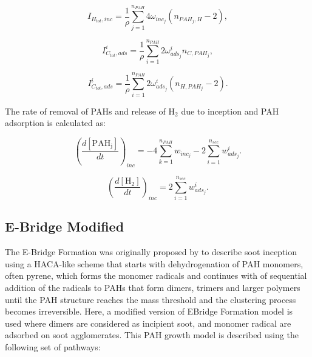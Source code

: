 \begin{equation}
	I_{H_{tot},{inc}} = \frac{1}{\rho}
	\sum_{j=1}^{n_{PAH}}
	4\omega_{inc_{j}} 
	\left(
	n_{PAH_j,H}-2
	\right)
	\label{eqn:IHtot_inc_dimcoal},
\end{equation}

\begin{equation}
	I^i_{C_{tot},ads} =
	\frac{1}{\rho}
	\sum_{i=1}^{n_{PAH}}
	2\omega^i_{ads_j}
	n_{C,PAH_j}
	\label{eqn:ICtotads_dimcoal},
\end{equation}

\begin{equation}
	I^i_{C_{tot},ads} =
	\frac{1}{\rho}
	\sum_{i=1}^{n_{PAH}}
	2\omega^i_{ads_j}
	\left(n_{H,PAH_j}-2\right)
	\label{eqn:IHtotads_dimcoal}.
\end{equation}

The rate of removal of PAHs and release of $\mathrm{H_2}$ due to inception and PAH adsorption is calculated as:

\begin{equation}
	\left(
	\frac{d\left[{\mathrm{PAH_j}}\right]}{dt}
	\right)_{inc}
	= 
	-4\sum_{k=1}^{n_{PAH}}w_{inc_{j}}-2\sum_{i=1}^{n_{sec}}w^i_{ads_j}
	\label{eqn:PAHscrub_dimcoal}.
\end{equation}

\begin{equation}
	\left(
	\frac{d\left[{\mathrm{H_2}}\right]}{dt}
	\right)_{inc}
	= 
	2\sum_{i=1}^{n_{sec}}w^i_{ads_j}
	\label{eqn:H2scrub_dimcoal}.
\end{equation}

\subsection{E-Bridge Modified}
The E-Bridge Formation was originally proposed by \citet{frenklach2020mechanism} to describe soot inception using a HACA-like scheme that starts with dehydrogenation of PAH monomers, often pyrene, which forms the monomer radicals and continues with of sequential addition of the radicals to PAHs that form dimers, trimers and larger polymers until the PAH structure reaches the mass threshold and the clustering process becomes irreversible. Here, a modified version of EBridge Formation model is used where dimers are considered as incipient soot, and monomer radical are adsorbed on soot agglomerates. This PAH growth model is described using the following set of pathways:


